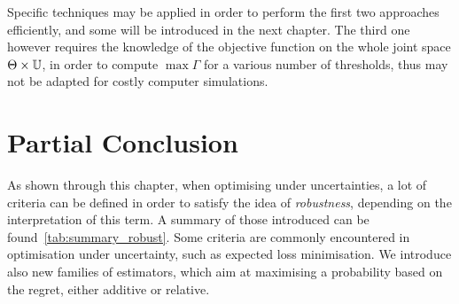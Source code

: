 \documentclass[../../Main_ManuscritThese.tex]{subfiles}
\begin{document}
Specific techniques may be applied in order to perform the first two
approaches efficiently, and some will be introduced in the next
chapter. The third one however requires the knowledge of the objective
function on the whole joint space $\Theta \times \mathbb{U}$, in order
to compute $\max \Gamma$ for a various number of thresholds, thus may
not be adapted for costly computer simulations.



\section{Partial Conclusion}
\label{sec:ch3_partial_ccl}
As shown through this chapter, when optimising under uncertainties, a
lot of criteria can be defined in order to satisfy the idea of
\emph{robustness}, depending on the interpretation of this term. A
summary of those introduced can be
found~\cref{tab:summary_robust}. Some criteria are commonly
encountered in optimisation under uncertainty, such as expected loss
minimisation. We introduce also new families of estimators, which aim
at maximising a probability based on the regret, either additive or
relative.
\end{document}
